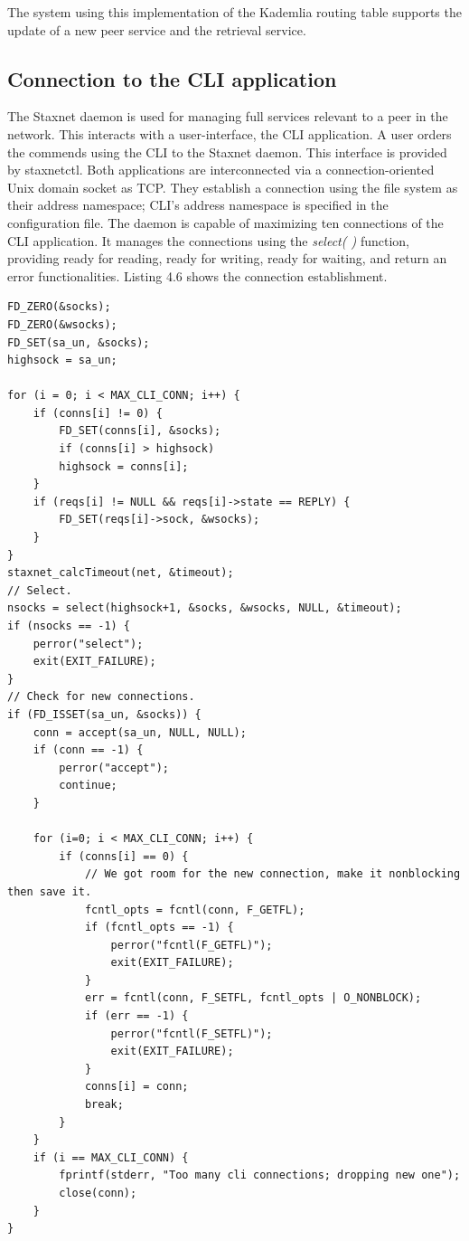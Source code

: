 The system using this implementation of the Kademlia routing table supports the update of a new peer service and the retrieval service.

\subsection{Connection to the CLI application}

The Staxnet daemon is used for managing full services relevant to a peer in the network. This interacts with a user-interface, the CLI application. A user orders the commends using the CLI to the Staxnet daemon. This interface is provided by staxnetctl. Both applications are interconnected via a connection-oriented Unix domain socket as TCP. They establish a connection using the file system as their address namespace; CLI's address namespace is specified in the configuration file. The daemon is capable of maximizing ten connections of the CLI application. It manages the connections using the \textit{select( )} function, providing ready for reading, ready for writing, ready for waiting, and return an error functionalities. Listing 4.6 shows the connection establishment.

\lstset{language=C} 
\begin{lstlisting}[caption=The connection establishment]
FD_ZERO(&socks);
FD_ZERO(&wsocks);
FD_SET(sa_un, &socks);
highsock = sa_un;

for (i = 0; i < MAX_CLI_CONN; i++) {
	if (conns[i] != 0) {
		FD_SET(conns[i], &socks);
		if (conns[i] > highsock)
		highsock = conns[i];
	}
	if (reqs[i] != NULL && reqs[i]->state == REPLY) {
		FD_SET(reqs[i]->sock, &wsocks);
	}
}
staxnet_calcTimeout(net, &timeout);
// Select.
nsocks = select(highsock+1, &socks, &wsocks, NULL, &timeout);
if (nsocks == -1) {
	perror("select");
	exit(EXIT_FAILURE);
} 
// Check for new connections.
if (FD_ISSET(sa_un, &socks)) {
	conn = accept(sa_un, NULL, NULL);
	if (conn == -1) {
		perror("accept");
		continue;
	}
	
	for (i=0; i < MAX_CLI_CONN; i++) {
		if (conns[i] == 0) {
			// We got room for the new connection, make it nonblocking then save it.
			fcntl_opts = fcntl(conn, F_GETFL);
			if (fcntl_opts == -1) {
				perror("fcntl(F_GETFL)");
				exit(EXIT_FAILURE);
			}
			err = fcntl(conn, F_SETFL, fcntl_opts | O_NONBLOCK);
			if (err == -1) {
				perror("fcntl(F_SETFL)");
				exit(EXIT_FAILURE);
			}
			conns[i] = conn;
			break;
		}
	}
	if (i == MAX_CLI_CONN) {
		fprintf(stderr, "Too many cli connections; dropping new one");
		close(conn);
	}
}


\end{lstlisting}

